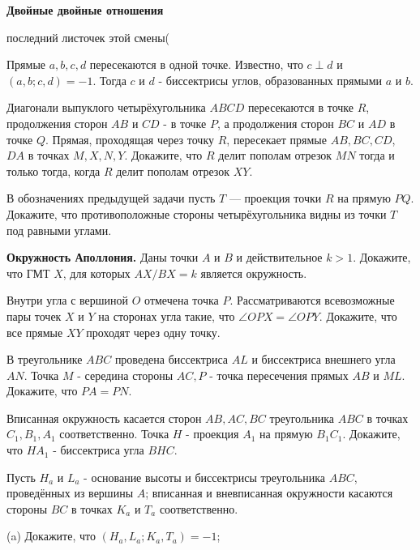 \centerline{\bf \Huge Двойные двойные отношения}

\begin{flushright}
        \scriptsize{последний листочек этой смены(}
\end{flushright}

Прямые $a, b, c, d$ пересекаются в одной точке. Известно, что $c \perp d$ и  $(a, b ; c, d)=-1$. Тогда $c$ и $d$ - биссектрисы углов, образованных прямыми $a$ и $b$.

Диагонали выпуклого четырёхугольника $A B C D$ пересекаются в точке $R$, продолжения сторон $A B$ и $C D$ - в точке $P$, а продолжения сторон $B C$ и $A D$ в точке $Q$. Прямая, проходящая через точку $R$, пересекает прямые $A B, B C, C D$, $D A$ в точках $M, X, N, Y$. Докажите, что $R$ делит пополам отрезок $M N$ тогда и только тогда, когда $R$ делит пополам отрезок $X Y$.

В обозначениях предыдущей задачи пусть $T$ --- проекция точки $R$ на прямую $P Q$. Докажите, что противоположные стороны четырёхугольника видны из точки $T$ под равными углами.

\textbf{Окружность Аполлония.} Даны точки $A$ и $B$ и действительное $k>1$. Докажите, что ГМТ $X$, для которых $A X / B X=k$ является окружность.

Внутри угла с вершиной $O$ отмечена точка $P$. Рассматриваются всевозможные пары точек $X$ и $Y$ на сторонах угла такие, что $\angle O P X=\angle O P Y$. Докажите, что все прямые $X Y$ проходят через одну точку.

В треугольнике $A B C$ проведена биссектриса $A L$ и биссектриса внешнего угла $A N$. Точка $M$ - середина стороны $A C, P$ - точка пересечения прямых $A B$ и $M L$. Докажите, что $P A=P N$.

Вписанная окружность касается сторон $A B, A C, B C$ треугольника $A B C$ в точках $C_1, B_1, A_1$ соответственно. Точка $H$ - проекция $A_1$ на прямую $B_1 C_1$. Докажите, что $H A_1$ - биссектриса угла $B H C$.

Пусть $H_a$ и $L_a$ - основание высоты и биссектрисы треугольника $A B C$, проведённых из вершины $A$; вписанная и вневписанная окружности касаются стороны $B C$ в точках $K_a$ и $T_a$ соответственно.

(a) Докажите, что $\left(H_a, L_a ; K_a, T_a\right)=-1$;


\newpage

\hspace{3mm}

